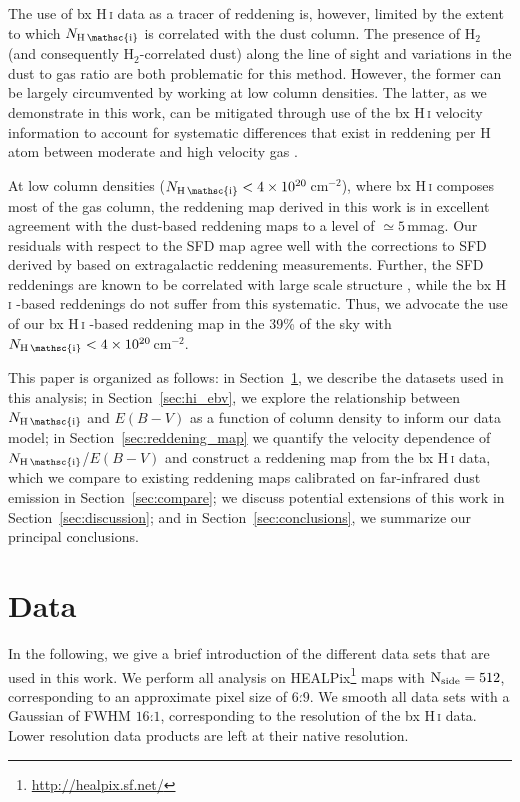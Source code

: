 \documentclass[iop,apj]{emulateapj}
\makeatletter
\def\testbx{bx}%
\DeclareRobustCommand{\ion}[2]{%
\relax\ifmmode
\ifx\testbx\f@series
{\mathbf{#1\,\mathsc{#2}}}\else
{\mathrm{#1\,\mathsc{#2}}}\fi
\else\textup{#1\,{\mdseries\textsc{#2}}}%
\fi}
\makeatother
\begin{document}
The use of \ion{H}{i} data as a tracer of reddening is, however, limited by the extent to which $N_\ion{H}{i}$ is correlated with the dust column. The presence of H$_2$ (and consequently H$_2$-correlated dust) along the line of sight and variations in the dust to gas ratio are both problematic for this method. However, the former can be largely circumvented by working at low column densities. The latter, as we demonstrate in this work, can be mitigated through use of the \ion{H}{i} velocity information to account for systematic differences that exist in reddening per H atom between moderate and high velocity gas \citep[e.g.][]{Planck_2011_XXIV}.

At low column densities ($N_\ion{H}{i} < 4\times10^{20}\,$cm$^{-2}$), where \ion{H}{i} composes most of the gas column, the reddening map derived in this work is in excellent agreement with the dust-based reddening maps to a level of $\simeq 5$\,mmag. Our residuals with respect to the SFD map agree well with the corrections to SFD derived by \citet{Peek+Graves_2010} based on extragalactic reddening measurements. Further, the SFD reddenings are known to be correlated with large scale structure \citep{Yahata+etal_2007}, while the \ion{H}{i}-based reddenings do not suffer from this systematic. Thus, we advocate the use of our \ion{H}{i}-based reddening map in the 39\% of the sky with $N_\ion{H}{i} < 4\times10^{20}\,$cm$^{-2}$.

This paper is organized as follows: in Section~\ref{sec:data}, we describe the datasets used in this analysis; in Section~\ref{sec:hi_ebv}, we explore the relationship between $N_\ion{H}{i}$ and $E(B-V)$ as a function of column density to inform our data model; in Section~\ref{sec:reddening_map} we quantify the velocity dependence of $N_\ion{H}{i}$/$E(B-V)$ and construct a reddening map from the \ion{H}{i} data, which we compare to existing reddening maps calibrated on far-infrared dust emission in Section~\ref{sec:compare}; we discuss potential extensions of this work in Section~\ref{sec:discussion}; and in Section~\ref{sec:conclusions}, we summarize our principal conclusions.

\section{Data}
\label{sec:data}

In the following, we give a brief introduction of the different data sets that are used in this work. We perform all analysis on HEALPix\footnote{\url{http://healpix.sf.net/}} maps \citep{Gorski+etal_2005} with $\rm N_{side}=512$, corresponding to an approximate pixel size of $6\overset{'}{.}9$. We smooth all data sets with a Gaussian of FWHM $16\overset{'}{.}1$, corresponding to the resolution of the \ion{H}{i} data. Lower resolution data products are left at their native resolution.
\end{document}
